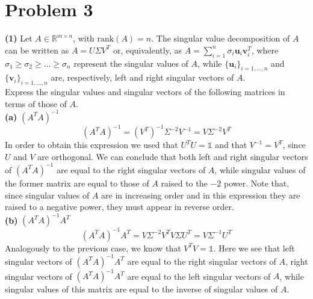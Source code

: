 \documentclass[a4paper,11pt]{article}
\newcommand{\R}{\mathbb{R}}
\begin{document}
\section*{Problem 3}

\noindent \textbf{(1)} Let $A \in \R^{m\times n}$, with $\text{rank}(A) = n$. The singular value decomposition of $A$ can be written as $A = U \Sigma V^T$ or, equivalently, as $A = \sum_{i=1}^n \sigma_i \textbf{u}_i \textbf{v}_i^T$, where $\sigma_1 \ge \sigma_2 \ge \dots \ge \sigma_n$ represent the singular values of $A$, while $\{\textbf{u}_{i}\}_{i=1,\dots,n}$ and $\{\textbf{v}_{i}\}_{i=1,\dots,n}$ are, respectively, left and right singular vectors of $A$.\\

\noindent Express the singular values and singular vectors of the following matrices in terms of those of $A$.\\

\noindent \textbf{(a)} {$(A^{T}A)^{-1}$}
\[(A^{T}A)^{-1} = (V^{T})^{-1}\Sigma^{-2}V^{-1}=V\Sigma^{-2}V^{T}\]
In order to obtain this expression we used that $U^{T}U=\mathbb{1}$ and that $V^{-1}=V^{T}$, since $U$ and $V$ are orthogonal. We can conclude that both left and right singular vectors of $(A^{T}A)^{-1}$ are equal to the right singular vectors of $A$, while singular values of the former matrix are equal to those of $A$ raised to the $-2$ power. Note that, since singular values of $A$ are in increasing order and in this expression they are raised to a negative power, they must appear in reverse order.\\


\noindent \textbf{(b)} $(A^{T}A)^{-1}A^{T}$
\[(A^{T}A)^{-1}A^{T} = V\Sigma^{-2}V^{T}V\Sigma U^{T}=V\Sigma^{-1}U^{T}\]
Analogously to the previous case, we know that $V^{T}V=\mathbb{1}$. Here we see that left singular vectors of $(A^{T}A)^{-1}A^{T}$ are equal to the right singular vectors of $A$, right singular vectors of $(A^{T}A)^{-1}A^{T}$ are equal to the left singular vectors of $A$, while singular values of this matrix are equal to the inverse of singular values of $A$.\\
\end{document}
